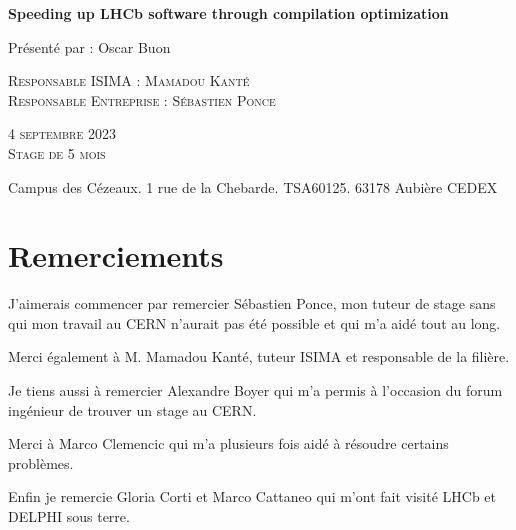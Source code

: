 \documentclass[a4paper,11pt]{report}
\begin{document}
\begin{titlepage}
    \vfill

    {\huge\bfseries Speeding up LHCb software through compilation optimization \par}

    \vfill

    {\Large Présenté par : Oscar Buon \par}

    \vfill

    \begin{minipage}{0.65\textwidth}
        \textsc{Responsable ISIMA : Mamadou Kanté}\\
        \textsc{Responsable Entreprise : Sébastien Ponce}\\
    \end{minipage}
    \hfill
    \begin{minipage}{0.25\textwidth}
        \textsc{4 septembre 2023} \\
        \textsc{Stage de 5 mois} \\
    \end{minipage}

    \vfill

    Campus des Cézeaux. 1 rue de la Chebarde. TSA60125. 63178 Aubière CEDEX
\end{titlepage}


\chapter*{Remerciements}
J'aimerais commencer par remercier Sébastien Ponce, mon tuteur de stage sans qui mon travail au CERN n'aurait pas été possible et qui m'a aidé tout au long.

Merci également à M. Mamadou Kanté, tuteur ISIMA et responsable de la filière.

\bigskip
Je tiens aussi à remercier Alexandre Boyer qui m'a permis à l'occasion du forum ingénieur de trouver un stage au CERN.

\bigskip
Merci à Marco Clemencic qui m'a plusieurs fois aidé à résoudre certains problèmes.

\bigskip
Enfin je remercie Gloria Corti et Marco Cattaneo qui m'ont fait visité LHCb et DELPHI sous terre.

\tableofcontents

\listoffigures
\end{document}
